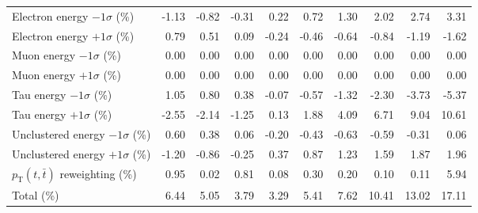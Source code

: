 \begin{table}[htbp]
{\begin{tabular}{lrrrrrrrrr}
Electron energy $-1\sigma$ (\%) & -1.13 & -0.82 & -0.31 & 0.22 & 0.72 & 1.30 & 2.02 & 2.74 & 3.31 \\ 
Electron energy $+1\sigma$ (\%) & 0.79 & 0.51 & 0.09 & -0.24 & -0.46 & -0.64 & -0.84 & -1.19 & -1.62 \\ 
Muon energy $-1\sigma$ (\%) & 0.00 & 0.00 & 0.00 & 0.00 & 0.00 & 0.00 & 0.00 & 0.00 & 0.00 \\ 
Muon energy $+1\sigma$ (\%) & 0.00 & 0.00 & 0.00 & 0.00 & 0.00 & 0.00 & 0.00 & 0.00 & 0.00 \\ 
Tau energy $-1\sigma$ (\%) & 1.05 & 0.80 & 0.38 & -0.07 & -0.57 & -1.32 & -2.30 & -3.73 & -5.37 \\ 
Tau energy $+1\sigma$ (\%) & -2.55 & -2.14 & -1.25 & 0.13 & 1.88 & 4.09 & 6.71 & 9.04 & 10.61 \\ 
Unclustered energy $-1\sigma$ (\%) & 0.60 & 0.38 & 0.06 & -0.20 & -0.43 & -0.63 & -0.59 & -0.31 & 0.06 \\ 
Unclustered energy $+1\sigma$ (\%) & -1.20 & -0.86 & -0.25 & 0.37 & 0.87 & 1.23 & 1.59 & 1.87 & 1.96 \\ 
$p_\mathrm{T}(t,\bar{t})$ reweighting (\%) & 0.95 & 0.02 & 0.81 & 0.08 & 0.30 & 0.20 & 0.10 & 0.11 & 5.94 \\ 
\hline 
Total (\%) & 6.44  & 5.05  & 3.79  & 3.29  & 5.41  & 7.62  & 10.41  & 13.02  & 17.11 \\ 
\hline 
\end{tabular}
}
\end{table}
